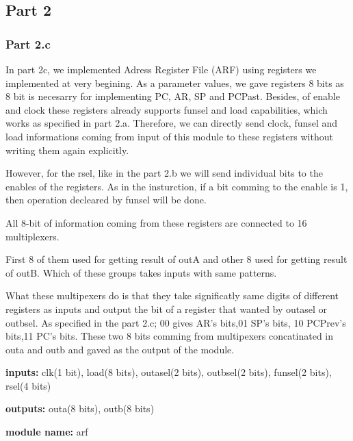 \documentclass[pdftex,12pt,a4paper]{article}
\begin{document}
\subsection{Part 2}
\subsubsection{Part 2.c}
In part 2c, we implemented Adress Register File (ARF) using registers we implemented at 
very begining. As a parameter values, we gave registers 8 bits as 8 bit is necesarry for 
implementing PC, AR, SP and PCPast. Besides, of enable and clock these registers 
already supports funsel and load capabilities, which works as specified in part 2.a. 
Therefore, we can directly send clock, funsel and load informations coming from 
input of this module to these registers without writing them again explicitly.

However, for the rsel, like in the part 2.b we will send individual bits to the enables of
the registers. As in the insturction, if a bit comming to the enable is 1, then operation
decleared by funsel will be done.

All 8-bit of information coming from these registers are connected to 16 multiplexers.

First 8 of them used for getting result of outA and other 8 used for getting result of 
outB. Which of these groups takes inputs with same patterns.

What these multipexers do is that they take significatly same digits of different registers 
as inputs and output the bit of a register that wanted by outasel or outbsel. As specified
in the part 2.c; 00 gives AR's bits,01 SP's bits, 10 PCPrev's bits,11 PC's bits. 
These two 8 bits comming from multipexers concatinated in outa and outb and gaved as
the output of the module.

\textbf{inputs:}    clk(1 bit),
load(8 bits),
outasel(2 bits),
outbsel(2 bits),
funsel(2 bits),
rsel(4 bits)

\textbf{outputs:}    
outa(8 bits),
outb(8 bits)

\textbf{module name:} arf
\end{document}
